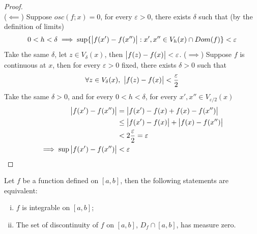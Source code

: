 \documentclass[11pt]{article}
\begin{document}
	\begin{proof}
		\quad \\
		($\impliedby$) Suppose $osc(f; x) = 0$, for every $\varepsilon > 0$, there exists $\delta$ such that (by the definition of limits)
		\begin{align}
			0 < h < \delta
			\implies
			\sup\{
			\big \vert {f(x') - f(x'')} \big \vert: x', x'' \in V_h(x) \cap Dom(f)
			\} < \varepsilon
		\end{align}
		Take the same $\delta$, let $z \in V_\delta(x)$, then $\big \vert {f(z) - f(x)} \big \vert < \varepsilon$.
		($\implies$) Suppose $f$ is continuous at $x$, then for every $\varepsilon > 0$ fixed, there exists $\delta > 0$ such that
		\begin{align}
			\forall z \in V_\delta(x),\ \big \vert {f(z) - f(x)} \big \vert < \frac{\varepsilon}{2}
		\end{align}
		Take the same $\delta > 0$, and for every $0 < h < \delta$, for every $x', x'' \in V_{\varepsilon/2}(x)$
		\begin{align}
			\big \vert {f(x') - f(x'')} \big \vert &= \big \vert {f(x') - f(x) + f(x) - f(x'')} \big \vert \\
			&\leq \big \vert {f(x') - f(x)} \big \vert + \big \vert {f(x) - f(x'')} \big \vert \\
			&< 2 \frac{\varepsilon}{2} = \varepsilon \\
			\implies \sup \big \vert {f(x') - f(x'')} \big \vert &< \varepsilon
		\end{align}
	\end{proof}
	
	\begin{theorem}
		Let $f$ be a function defined on $[a, b]$, then the following statements are equivalent:
		\begin{enumerate}[(i)]
			\item $f$ is integrable on $[a, b]$;
			\item The set of discontinuity of $f$ on $[a, b]$, $D_f \cap [a, b]$, has measure zero.
		\end{enumerate}
	\end{theorem}
	
\end{document}
